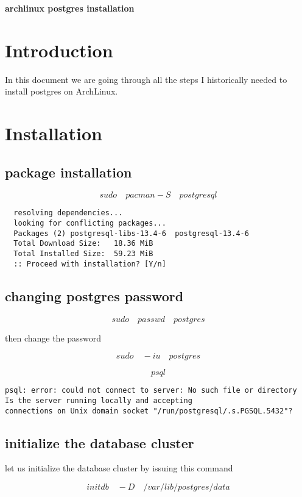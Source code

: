 \documentclass[a4paper,12pt]{article}
\begin{document}
\textbf{archlinux postgres installation}
\tableofcontents

\section{Introduction}

In this document we are going through all the steps I historically needed to install postgres on ArchLinux.


\section{Installation}

\subsection {package installation}
\[sudo \quad pacman -S \quad postgresql \]


\begin{lstlisting}
  resolving dependencies...
  looking for conflicting packages...   
  Packages (2) postgresql-libs-13.4-6  postgresql-13.4-6   
  Total Download Size:   18.36 MiB   
  Total Installed Size:  59.23 MiB   
  :: Proceed with installation? [Y/n]         
\end{lstlisting}

\subsection {changing postgres password}

\[sudo \quad passwd \quad postgres  \]

then change the password

\[sudo \quad -iu \quad postgres \]


\[ psql \]

\begin{lstlisting}
psql: error: could not connect to server: No such file or directory  
Is the server running locally and accepting   
connections on Unix domain socket "/run/postgresql/.s.PGSQL.5432"?   
\end{lstlisting}

\subsection {initialize the database cluster}

let us initialize the database cluster by issuing this command

\[ initdb \quad -D \quad /var/lib/postgres/data \]
\end{document}
